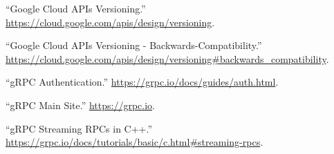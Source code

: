\documentclass[11pt]{article}
\begin{document}
{{\begin{thebibliography}{40}
\mdbibitemlabel{{}[7]}\textquotedblleft{}Google Cloud APIs Versioning.\textquotedblright{} \href{https://cloud.google.com/apis/design/versioning}{{\ttfamily https://\hspace{0pt}cloud.\hspace{0pt}google.\hspace{0pt}com/\hspace{0pt}apis/\hspace{0pt}design/\hspace{0pt}versioning}}.\label{apiversioning}%

\mdbibitemlabel{{}[8]}\textquotedblleft{}Google Cloud APIs Versioning - Backwards-Compatibility.\textquotedblright{} \href{https://cloud.google.com/apis/design/versioning\%23backwards_compatibility}{{\ttfamily https://\hspace{0pt}cloud.\hspace{0pt}google.\hspace{0pt}com/\hspace{0pt}apis/\hspace{0pt}design/\hspace{0pt}versioning\#\hspace{0pt}backwards\_\hspace{0pt}compatibility}}.\label{apiversioningbackwardscompatibility}%

\mdbibitemlabel{{}[9]}\textquotedblleft{}gRPC Authentication.\textquotedblright{} \href{https://grpc.io/docs/guides/auth.html}{{\ttfamily https://\hspace{0pt}grpc.\hspace{0pt}io/\hspace{0pt}docs/\hspace{0pt}guides/\hspace{0pt}auth.\hspace{0pt}html}}.\label{grpcauth}%

\mdbibitemlabel{{}[10]}\textquotedblleft{}gRPC Main Site.\textquotedblright{} \href{https://grpc.io}{{\ttfamily https://\hspace{0pt}grpc.\hspace{0pt}io}}.\label{grpc}%

\mdbibitemlabel{{}[11]}\textquotedblleft{}gRPC Streaming RPCs in C++.\textquotedblright{} \href{https://grpc.io/docs/tutorials/basic/c.html\%23streaming-rpcs}{{\ttfamily https://\hspace{0pt}grpc.\hspace{0pt}io/\hspace{0pt}docs/\hspace{0pt}tutorials/\hspace{0pt}basic/\hspace{0pt}c.\hspace{0pt}html\#\hspace{0pt}streaming-\hspace{0pt}rpcs}}.\label{grpcstreamc}%


\end{thebibliography}}}
\end{document}
